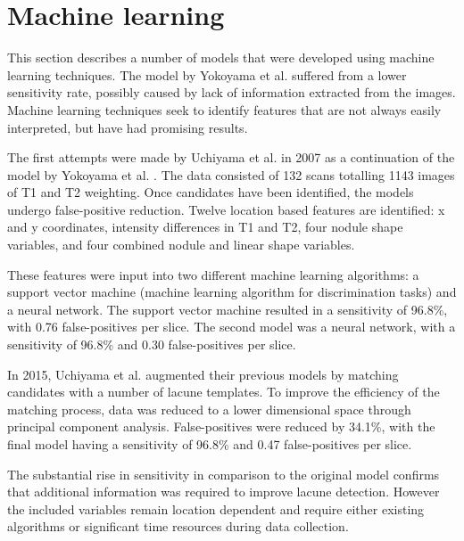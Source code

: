 \section{Machine learning}\label{litrev-ml}

This section describes a number of models that were developed using machine learning techniques. The model by Yokoyama et al. \cite{Yokoyama2007} suffered from a lower sensitivity rate, possibly caused by lack of information extracted from the images. Machine learning techniques seek to identify features that are not always easily interpreted, but have had promising results. 

The first attempts were made by Uchiyama et al. in 2007 \cite{Uchiyama20071554, Uchiyama2007b} as a continuation of the model by Yokoyama et al. \cite{Yokoyama2007}. The data consisted of 132 scans totalling 1143 images of T1 and T2 weighting. Once candidates have been identified, the models undergo false-positive reduction. Twelve location based features are identified: x and y coordinates, intensity differences in T1 and T2, four nodule shape variables, and four combined nodule and linear shape variables.

These features were input into two different machine learning algorithms: a support vector machine (machine learning algorithm for discrimination tasks) and a neural network. The support vector machine resulted in a sensitivity of 96.8\%, with 0.76 false-positives per slice. The second model was a neural network, with a sensitivity of 96.8\% and 0.30 false-positives per slice.

In 2015, Uchiyama et al. \cite{Uchiyama2015} augmented their previous models by matching candidates with a number of lacune templates. To improve the efficiency of the matching process, data was reduced to a lower dimensional space through principal component analysis. False-positives were reduced by 34.1\%, with the final model having a sensitivity of 96.8\% and 0.47 false-positives per slice.

The substantial rise in sensitivity in comparison to the original model \cite{Yokoyama2007} confirms that additional information was required to improve lacune detection. However the included variables remain location dependent and require either existing algorithms or significant time resources during data collection.


